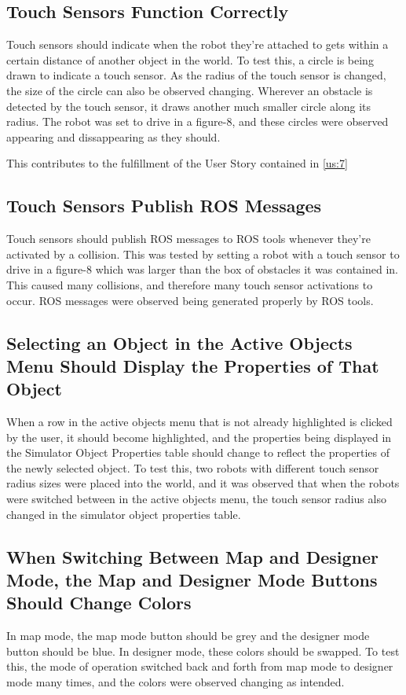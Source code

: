 \subsection{Touch Sensors Function Correctly}
Touch sensors should indicate when the robot they're attached to gets within a certain distance of another object in the world. To test this, a circle is being drawn to indicate a touch sensor. As the radius of the touch sensor is changed, the size of the circle can also be observed changing. Wherever an obstacle is detected by the touch sensor, it draws another much smaller circle along its radius. The robot was set to drive in a figure-8, and these circles were observed appearing and dissappearing as they should.

This contributes to the fulfillment of the User Story contained in \ref{us:7}

\subsection{Touch Sensors Publish ROS Messages}
Touch sensors should publish ROS messages to ROS tools whenever they're activated by a collision. This was tested by setting a robot with a touch sensor to drive in a figure-8 which was larger than the box of obstacles it was contained in. This caused many collisions, and therefore many touch sensor activations to occur. ROS messages were observed being generated properly by ROS tools.

\subsection{Selecting an Object in the Active Objects Menu Should Display the Properties of That Object}
When a row in the active objects menu that is not already highlighted is clicked by the user, it should become highlighted, and the properties being displayed in the Simulator Object Properties table should change to reflect the properties of the newly selected object. To test this, two robots with different touch sensor radius sizes were placed into the world, and it was observed that when the robots were switched between in the active objects menu, the touch sensor radius also changed in the simulator object properties table.

\subsection{When Switching Between Map and Designer Mode, the Map and Designer Mode Buttons Should Change Colors}
In map mode, the map mode button should be grey and the designer mode button should be blue. In designer mode, these colors should be swapped. To test this, the mode of operation switched back and forth from map mode to designer mode many times, and the colors were observed changing as intended.

